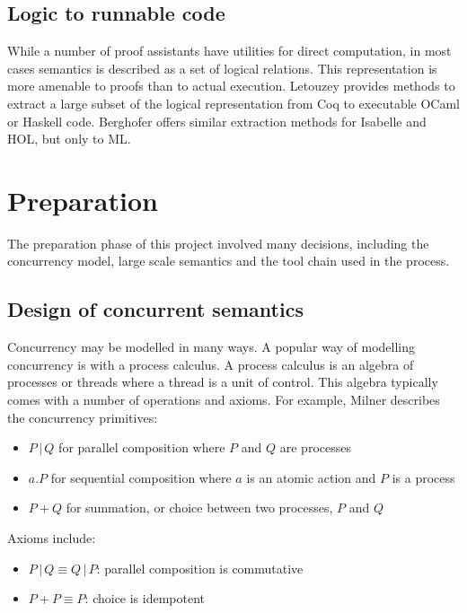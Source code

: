 \documentclass[12pt,twoside,notitlepage]{report}
\theoremstyle{plain}%
\theoremstyle{definition}
\theoremstyle{remark}
\begin{document}
\section{Logic to runnable code}
While a number of proof assistants have utilities for direct computation, in most cases semantics is described as a set of logical relations. This representation is more amenable to proofs than to actual execution. Letouzey\cite{letouzey2008extraction} provides methods to extract a large subset of the logical representation from Coq to executable OCaml or Haskell code. Berghofer\cite{berghofer2003program} offers similar extraction methods for Isabelle and HOL, but only to ML.


\chapter{Preparation}
The preparation phase of this project involved many decisions, including the concurrency model, large scale semantics and the tool chain used in the process.

\section{Design of concurrent semantics}
Concurrency may be modelled in many ways. A popular way of modelling concurrency is with a process calculus. A process calculus is an algebra of processes or threads where a thread is a unit of control. This algebra typically comes with a number of operations and axioms.  For example, Milner\cite{milner1982calculus} describes the concurrency primitives:
\begin{itemize}
\item{$ P\, | \, Q $  for parallel composition where $ P $ and $ Q $ are processes}
\item{ $ a.P  $ for sequential composition where $ a $ is an atomic action and $ P $ is a process}
\item{$ P+Q $ for summation, or choice between two processes, $ P$ and $ Q $}
\end{itemize}

Axioms include:
\begin{itemize}
\item{$ P\, | \, Q \equiv  Q\, | \, P  $: parallel composition is commutative}
\item{$ P+P \equiv P $: choice is idempotent}
\end{itemize}
\end{document}
